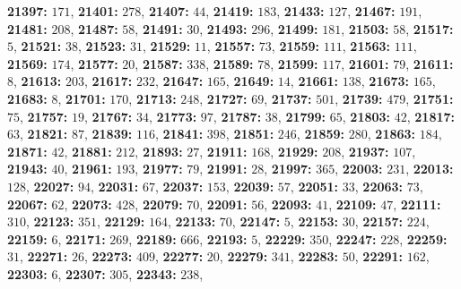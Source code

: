 \textsf{\bfseries 21397:} $171$, \textsf{\bfseries 21401:} $278$, \textsf{\bfseries 21407:} $44$, \textsf{\bfseries 21419:} $183$, \textsf{\bfseries 21433:} $127$, \textsf{\bfseries 21467:} $191$, \textsf{\bfseries 21481:} $208$, \textsf{\bfseries 21487:} $58$, \textsf{\bfseries 21491:} $30$, \textsf{\bfseries 21493:} $296$, \textsf{\bfseries 21499:} $181$, \textsf{\bfseries 21503:} $58$, \textsf{\bfseries 21517:} $5$, \textsf{\bfseries 21521:} $38$, \textsf{\bfseries 21523:} $31$, \textsf{\bfseries 21529:} $11$, \textsf{\bfseries 21557:} $73$, \textsf{\bfseries 21559:} $111$, \textsf{\bfseries 21563:} $111$, \textsf{\bfseries 21569:} $174$, \textsf{\bfseries 21577:} $20$, \textsf{\bfseries 21587:} $338$, \textsf{\bfseries 21589:} $78$, \textsf{\bfseries 21599:} $117$, \textsf{\bfseries 21601:} $79$, \textsf{\bfseries 21611:} $8$, \textsf{\bfseries 21613:} $203$, \textsf{\bfseries 21617:} $232$, \textsf{\bfseries 21647:} $165$, \textsf{\bfseries 21649:} $14$, \textsf{\bfseries 21661:} $138$, \textsf{\bfseries 21673:} $165$, \textsf{\bfseries 21683:} $8$, \textsf{\bfseries 21701:} $170$, \textsf{\bfseries 21713:} $248$, \textsf{\bfseries 21727:} $69$, \textsf{\bfseries 21737:} $501$, \textsf{\bfseries 21739:} $479$, \textsf{\bfseries 21751:} $75$, \textsf{\bfseries 21757:} $19$, \textsf{\bfseries 21767:} $34$, \textsf{\bfseries 21773:} $97$, \textsf{\bfseries 21787:} $38$, \textsf{\bfseries 21799:} $65$, \textsf{\bfseries 21803:} $42$, \textsf{\bfseries 21817:} $63$, \textsf{\bfseries 21821:} $87$, \textsf{\bfseries 21839:} $116$, \textsf{\bfseries 21841:} $398$, \textsf{\bfseries 21851:} $246$, \textsf{\bfseries 21859:} $280$, \textsf{\bfseries 21863:} $184$, \textsf{\bfseries 21871:} $42$, \textsf{\bfseries 21881:} $212$, \textsf{\bfseries 21893:} $27$, \textsf{\bfseries 21911:} $168$, \textsf{\bfseries 21929:} $208$, \textsf{\bfseries 21937:} $107$, \textsf{\bfseries 21943:} $40$, \textsf{\bfseries 21961:} $193$, \textsf{\bfseries 21977:} $79$, \textsf{\bfseries 21991:} $28$, \textsf{\bfseries 21997:} $365$, \textsf{\bfseries 22003:} $231$, \textsf{\bfseries 22013:} $128$, \textsf{\bfseries 22027:} $94$, \textsf{\bfseries 22031:} $67$, \textsf{\bfseries 22037:} $153$, \textsf{\bfseries 22039:} $57$, \textsf{\bfseries 22051:} $33$, \textsf{\bfseries 22063:} $73$, \textsf{\bfseries 22067:} $62$, \textsf{\bfseries 22073:} $428$, \textsf{\bfseries 22079:} $70$, \textsf{\bfseries 22091:} $56$, \textsf{\bfseries 22093:} $41$, \textsf{\bfseries 22109:} $47$, \textsf{\bfseries 22111:} $310$, \textsf{\bfseries 22123:} $351$, \textsf{\bfseries 22129:} $164$, \textsf{\bfseries 22133:} $70$, \textsf{\bfseries 22147:} $5$, \textsf{\bfseries 22153:} $30$, \textsf{\bfseries 22157:} $224$, \textsf{\bfseries 22159:} $6$, \textsf{\bfseries 22171:} $269$, \textsf{\bfseries 22189:} $666$, \textsf{\bfseries 22193:} $5$, \textsf{\bfseries 22229:} $350$, \textsf{\bfseries 22247:} $228$, \textsf{\bfseries 22259:} $31$, \textsf{\bfseries 22271:} $26$, \textsf{\bfseries 22273:} $409$, \textsf{\bfseries 22277:} $20$, \textsf{\bfseries 22279:} $341$, \textsf{\bfseries 22283:} $50$, \textsf{\bfseries 22291:} $162$, \textsf{\bfseries 22303:} $6$, \textsf{\bfseries 22307:} $305$, \textsf{\bfseries 22343:} $238$, 
